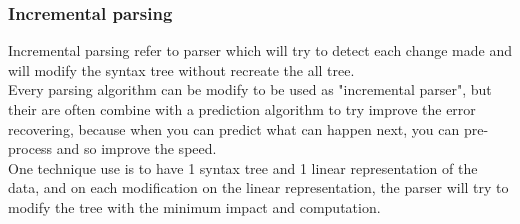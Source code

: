 \subsubsection{Incremental parsing}
Incremental parsing refer to parser which will try to detect each change made and will modify the syntax tree without recreate the all tree.\cite{grune2008parsing}\cite{horspool1990incremental}
\\Every parsing algorithm can be modify to be used as "incremental parser", but their are often combine with a prediction algorithm to try improve the error recovering, because when you can predict what can happen next, you can pre-process and so improve the speed.
\\One technique use is to have 1 syntax tree and 1 linear representation of the data, and on each modification on the linear representation, the parser will try to modify the tree with the minimum impact and computation.
